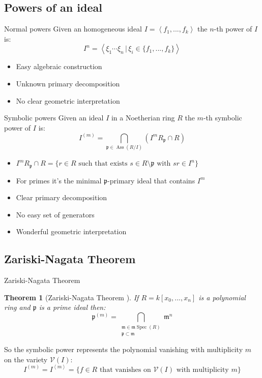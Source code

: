 \documentclass[dvipsnames]{beamer}
\theoremstyle{plain}
\newtheorem{teo}{Theorem}[section]
\theoremstyle{remark}
\theoremstyle{definition}
\newcommand{\p}{\mathfrak{p}}
\newcommand{\mm}{\mathfrak{m}}
\DeclareMathOperator{\Ass}{Ass}
\DeclareMathOperator{\Spec}{Spec}
\begin{document}
\subsection{Powers of an ideal}

\begin{frame}{Normal powers}
Given an homogeneous ideal $ I = \left\langle  f_1 , ... ,f_k \right\rangle  $ the $ n $-th power of $ I $ is: 
\[
 I^n = \left\langle \xi_1 \cdots \xi_n \,|\, \xi_i \in \{ f_1 , ... ,f_k \} \right\rangle 
\]
\pause
\begin{itemize}
\item Easy algebraic construction
\item Unknown primary decomposition %
\item No clear geometric interpretation 
\end{itemize}
\end{frame}

\begin{frame}{Symbolic powers}
Given an ideal $ I $ in a Noetherian ring $ R $ the $ m $-th symbolic power of $ I $ is:
\begin{equation*}\label{eq:sym_pow_def}
		I^{(m)} = \bigcap_{\p \in \Ass(R/I) } (I^m R_\p \cap R)
	\end{equation*}
\pause
\begin{itemize}
\item $ I^m R_\p \cap R = \{ r \in R \text{ such that exists } s \in R \setminus \p \text{ with } sr \in I^n\} $  
\item For primes it's the minimal $ \p $-primary ideal that contains $ I^m $
\item Clear primary decomposition
\item No easy set of generators
\item Wonderful geometric interpretation
\end{itemize}
\end{frame}

\subsection{Zariski-Nagata Theorem}

\begin{frame}{Zariski-Nagata Theorem}
\begin{teo}[Zariski-Nagata Theorem \cite{Zar49, Nagata62}] \label{teo:zarnaga}
	If $ R = k[x_0 , ... , x_n] $ is a polynomial ring and $ \p $ is a prime ideal then:
	\begin{equation*}\label{eq:zar_nag_teo}
	\p^{(m)} = \bigcap_{\substack{ \mm \in \mm \Spec (R)\\ \p \subset \mm}} \mm ^n
	\end{equation*}
\end{teo}
\pause
So the symbolic power represents the polynomial vanishing with multiplicity $ m $ on the variety $ \mathcal{V}(I) $:
\begin{equation*}\label{eq:ideal_vanish}
	I^{(m)} = I^{\left<m\right>} = \{ f \in R \text{ that vanishes on } \mathcal{V}(I) \text{ with multiplicity } m\}
\end{equation*} 
\end{frame}
\end{document}
